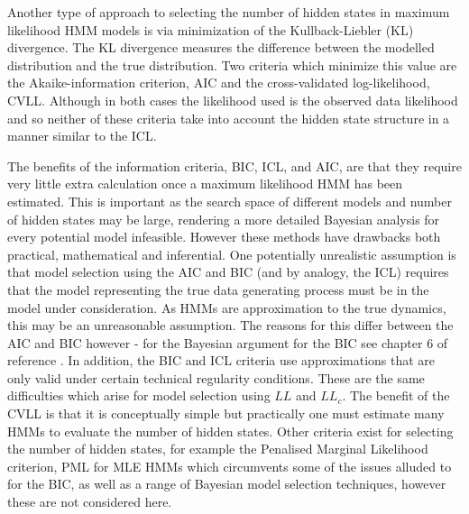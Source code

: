 Another type of approach to selecting the number of hidden states in maximum likelihood HMM models is via minimization of the Kullback-Liebler (KL) divergence\cite{kullbackInformationSufficiency1951}. The KL divergence  measures the difference between the modelled distribution and the true distribution. Two criteria which minimize this value are the Akaike-information criterion, AIC\cite{akaikeInformationTheoryExtension1998} and the cross-validated log-likelihood, CVLL\cite{celeuxSelectingHiddenMarkov2008}. Although in both cases the likelihood used is the observed data likelihood and so neither of these criteria take into account the hidden state structure in a manner similar to the ICL. 

The benefits of the information criteria, BIC, ICL, and AIC, are that they require  very little extra calculation once a maximum likelihood HMM has been estimated. This is important as the search space of different models and number of hidden states may be large, rendering a more detailed Bayesian analysis for every potential model infeasible. However these methods have drawbacks both practical, mathematical and inferential. One potentially unrealistic assumption is that model selection using the AIC and BIC (and by analogy, the ICL) requires that the model representing the true data generating process must be in the model under consideration\cite{ripley_1996}. As HMMs are approximation to the true dynamics, this may be an unreasonable assumption. The reasons for this differ between the AIC and BIC however - for the Bayesian argument for the BIC see chapter 6 of reference \cite{bernardo2007bayesian}. In addition, the BIC and ICL criteria use approximations that are only valid under certain technical regularity conditions\cite{mclachlanFiniteMixtureModels2000}. These are the same difficulties which arise for  model selection using $LL$ and $LL_{c}$.  The benefit of the CVLL  is that it is conceptually simple but practically  one must estimate many HMMs to evaluate the number of hidden states. Other criteria exist for selecting the number of hidden states, for example the Penalised Marginal Likelihood criterion, PML\cite{gassiatLikelihoodRatioInequalities2002} for MLE HMMs which circumvents some of the issues alluded to for the BIC, as well as a range of Bayesian model selection techniques\cite{gelmanBayesianDataAnalysis2014,bernardo2007bayesian}, however these are not considered here. 

